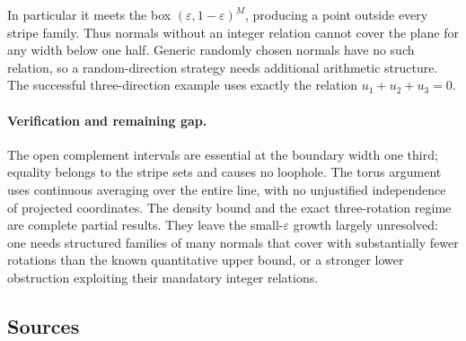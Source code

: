 \documentclass[11pt,a4paper]{article}
\begin{document}
In particular it meets the box $(\varepsilon,1-\varepsilon)^M$, producing a point outside every stripe family. Thus normals without an integer relation cannot cover the plane for any width below one half. Generic randomly chosen normals have no such relation, so a random-direction strategy needs additional arithmetic structure. The successful three-direction example uses exactly the relation $u_1+u_2+u_3=0$.

\paragraph{Verification and remaining gap.}
The open complement intervals are essential at the boundary width one third; equality belongs to the stripe sets and causes no loophole. The torus argument uses continuous averaging over the entire line, with no unjustified independence of projected coordinates. The density bound and the exact three-rotation regime are complete partial results. They leave the small-$\varepsilon$ growth largely unresolved: one needs structured families of many normals that cover with substantially fewer rotations than the known quantitative upper bound, or a stronger lower obstruction exploiting their mandatory integer relations.

\subsection{Sources}
\end{document}
